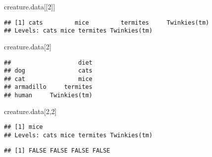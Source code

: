\documentclass[]{article}
\newenvironment{Shaded}{\begin{snugshade}}{\end{snugshade}}
\newcommand{\DecValTok}[1]{\textcolor[rgb]{0.00,0.00,0.81}{#1}}
\newcommand{\StringTok}[1]{\textcolor[rgb]{0.31,0.60,0.02}{#1}}
\newcommand{\OperatorTok}[1]{\textcolor[rgb]{0.81,0.36,0.00}{\textbf{#1}}}
\newcommand{\NormalTok}[1]{#1}
\begin{document}
\begin{Shaded}
\begin{Highlighting}[]
\NormalTok{creature.data[[}\DecValTok{2}\NormalTok{]]}
\end{Highlighting}
\end{Shaded}

\begin{verbatim}
## [1] cats         mice         termites     Twinkies(tm)
## Levels: cats mice termites Twinkies(tm)
\end{verbatim}

\begin{Shaded}
\begin{Highlighting}[]
\NormalTok{creature.data[}\DecValTok{2}\NormalTok{]}
\end{Highlighting}
\end{Shaded}

\begin{verbatim}
##                   diet
## dog               cats
## cat               mice
## armadillo     termites
## human     Twinkies(tm)
\end{verbatim}

\begin{Shaded}
\begin{Highlighting}[]
\NormalTok{creature.data[}\DecValTok{2}\NormalTok{,}\DecValTok{2}\NormalTok{]}
\end{Highlighting}
\end{Shaded}

\begin{verbatim}
## [1] mice
## Levels: cats mice termites Twinkies(tm)
\end{verbatim}

\begin{Shaded}
\end{Shaded}

\begin{verbatim}
## [1] FALSE FALSE FALSE FALSE
\end{verbatim}

\begin{Shaded}
\end{Shaded}
\end{document}
